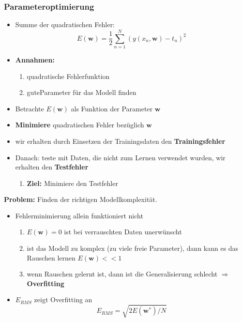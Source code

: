 	\subsubsection{Parameteroptimierung}
	\begin{itemize}
		\item Summe der quadratischen Fehler: 
		\begin{equation*}
			E(\pmb{w}) = \frac{1}{2} \sum_{n=1}^{N}(y(x_n, \pmb{w})-t_n)^2
		\end{equation*}
		\item \textbf{Annahmen:}\vspace*{-3pt}
		\begin{enumerate}[$\hookrightarrow$]
			\item quadratische Fehlerfunktion
			\item \dq gute\dq Parameter für das Modell finden
		\end{enumerate}
		\item Betrachte $E(\pmb{w})$ als Funktion der Parameter $\pmb{w}$
		\item \textbf{Minimiere} quadratischen Fehler bezüglich $\pmb{w}$
		\item wir erhalten durch Einsetzen der Trainingsdaten den \textbf{Trainingsfehler}
		\item Danach: teste mit Daten, die nicht zum Lernen verwendet wurden, wir erhalten den \textbf{Testfehler}\vspace*{-5pt}
		\begin{enumerate}[$\hookrightarrow$]
			\item \textbf{Ziel:} Minimiere den Testfehler
		\end{enumerate}
	\end{itemize}
	\textbf{Problem:} Finden der richtigen Modellkomplexität.
	\begin{itemize}
		\item Fehlerminimierung allein funktioniert nicht\vspace*{-3pt}
		\begin{enumerate}[$\hookrightarrow$]
			\item $E(\pmb{w})=0$ ist bei verrauschten Daten unerwünscht
			\item ist das Modell zu komplex (zu viele freie Parameter), dann kann es das Rauschen lernen $E(\pmb{w})<<1$
			\item wenn Rauschen gelernt ist, dann ist die Generalisierung schlecht $\Rightarrow$ \textbf{Overfitting}
		\end{enumerate}
		\item $E_{RMS}$ zeigt Overfitting an
		\begin{equation*}
			E_{RMS}=\sqrt{2E(\pmb{w^*})/N}
		\end{equation*}
	\end{itemize}
